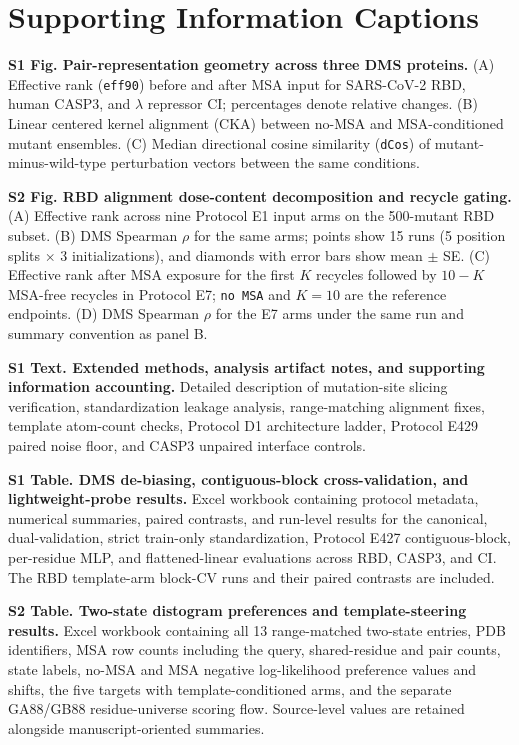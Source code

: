 \section*{Supporting Information Captions}

\textbf{S1 Fig. Pair-representation geometry across three DMS proteins.}
(A) Effective rank (\texttt{eff90}) before and after MSA input for SARS-CoV-2 RBD, human CASP3, and $\lambda$ repressor CI; percentages denote relative changes. (B) Linear centered kernel alignment (CKA) between no-MSA and MSA-conditioned mutant ensembles. (C) Median directional cosine similarity (\texttt{dCos}) of mutant-minus-wild-type perturbation vectors between the same conditions.

\textbf{S2 Fig. RBD alignment dose-content decomposition and recycle gating.}
(A) Effective rank across nine Protocol E1 input arms on the 500-mutant RBD subset. (B) DMS Spearman $\rho$ for the same arms; points show 15 runs (5 position splits $\times$ 3 initializations), and diamonds with error bars show mean $\pm$ SE. (C) Effective rank after MSA exposure for the first $K$ recycles followed by $10-K$ MSA-free recycles in Protocol E7; \texttt{no MSA} and $K=10$ are the reference endpoints. (D) DMS Spearman $\rho$ for the E7 arms under the same run and summary convention as panel B.

\textbf{S1 Text. Extended methods, analysis artifact notes, and supporting information accounting.}
Detailed description of mutation-site slicing verification, standardization leakage analysis, range-matching alignment fixes, template atom-count checks, Protocol D1 architecture ladder, Protocol E429 paired noise floor, and CASP3 unpaired interface controls.

\textbf{S1 Table. DMS de-biasing, contiguous-block cross-validation, and lightweight-probe results.}
Excel workbook containing protocol metadata, numerical summaries, paired contrasts, and run-level results for the canonical, dual-validation, strict train-only standardization, Protocol E427 contiguous-block, per-residue MLP, and flattened-linear evaluations across RBD, CASP3, and CI. The RBD template-arm block-CV runs and their paired contrasts are included.

\textbf{S2 Table. Two-state distogram preferences and template-steering results.}
Excel workbook containing all 13 range-matched two-state entries, PDB identifiers, MSA row counts including the query, shared-residue and pair counts, state labels, no-MSA and MSA negative log-likelihood preference values and shifts, the five targets with template-conditioned arms, and the separate GA88/GB88 residue-universe scoring flow. Source-level values are retained alongside manuscript-oriented summaries.

